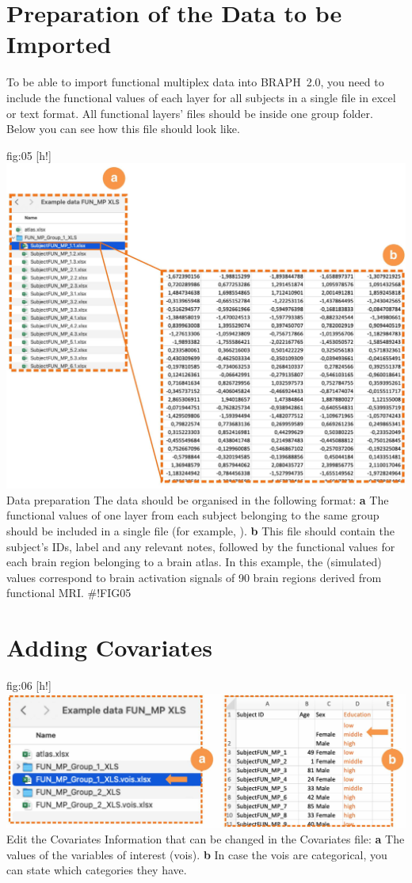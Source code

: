 \documentclass[justified]{tufte-handout}
\begin{document}
\clearpage
\section{Preparation of the Data to be Imported}

To be able to import functional multiplex data into BRAPH~2.0, you need to include the functional values of each layer for all subjects in a single file in excel or text format. All functional layers' files should be inside one group folder. Below you can see how this file should look like.

	{fig:05}
	{
	[h!]
	\includegraphics{fig05.jpg}
	}
	{Data preparation}
	{
	The data should be organised in the following format:
	{\bf a} The functional values of one layer from each subject belonging to the same group should be included in a single file (for example, ). 
	{\bf b} This file should contain the subject's IDs, label and any relevant notes, followed by the functional values for each brain region belonging to a brain atlas. In this example, the (simulated) values correspond to brain activation signals of 90 brain regions derived from functional MRI.
	}
#!FIG05

\section{Adding Covariates}

	{fig:06}
	{
	[h!]
	\includegraphics{fig06.jpg}
	}
	{Edit the Covariates}
	{
	Information that can be changed in the Covariates file: 
	{\bf a} The values of the variables of interest (vois).
	{\bf b} In case the vois are categorical, you can state which categories they have.
	}
	
\end{document}
